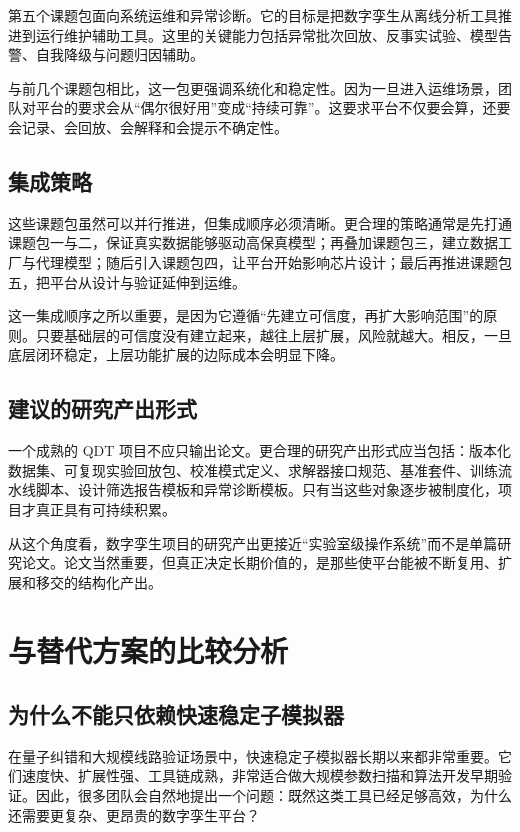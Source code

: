 \documentclass[11pt,a4paper]{article}
\newcommand{\QDT}{QDT}
\begin{document}
第五个课题包面向系统运维和异常诊断。它的目标是把数字孪生从离线分析工具推进到运行维护辅助工具。这里的关键能力包括异常批次回放、反事实试验、模型告警、自我降级与问题归因辅助。

与前几个课题包相比，这一包更强调系统化和稳定性。因为一旦进入运维场景，团队对平台的要求会从“偶尔很好用”变成“持续可靠”。这要求平台不仅要会算，还要会记录、会回放、会解释和会提示不确定性。

\subsection{集成策略}

这些课题包虽然可以并行推进，但集成顺序必须清晰。更合理的策略通常是先打通课题包一与二，保证真实数据能够驱动高保真模型；再叠加课题包三，建立数据工厂与代理模型；随后引入课题包四，让平台开始影响芯片设计；最后再推进课题包五，把平台从设计与验证延伸到运维。

这一集成顺序之所以重要，是因为它遵循“先建立可信度，再扩大影响范围”的原则。只要基础层的可信度没有建立起来，越往上层扩展，风险就越大。相反，一旦底层闭环稳定，上层功能扩展的边际成本会明显下降。

\subsection{建议的研究产出形式}

一个成熟的 \QDT{} 项目不应只输出论文。更合理的研究产出形式应当包括：版本化数据集、可复现实验回放包、校准模式定义、求解器接口规范、基准套件、训练流水线脚本、设计筛选报告模板和异常诊断模板。只有当这些对象逐步被制度化，项目才真正具有可持续积累。

从这个角度看，数字孪生项目的研究产出更接近“实验室级操作系统”而不是单篇研究论文。论文当然重要，但真正决定长期价值的，是那些使平台能被不断复用、扩展和移交的结构化产出。

\section{与替代方案的比较分析}

\subsection{为什么不能只依赖快速稳定子模拟器}

在量子纠错和大规模线路验证场景中，快速稳定子模拟器长期以来都非常重要。它们速度快、扩展性强、工具链成熟，非常适合做大规模参数扫描和算法开发早期验证。因此，很多团队会自然地提出一个问题：既然这类工具已经足够高效，为什么还需要更复杂、更昂贵的数字孪生平台？
\end{document}
